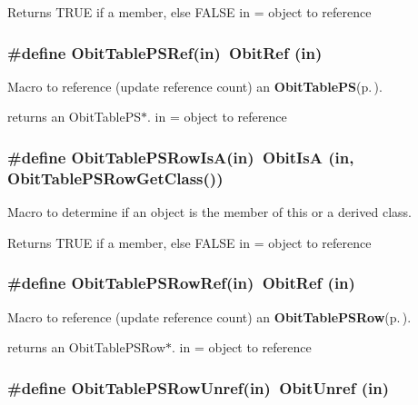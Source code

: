 Returns TRUE if a member, else FALSE in = object to reference 
\subsubsection{\setlength{\rightskip}{0pt plus 5cm}\#define Obit\-Table\-PSRef(in)\ Obit\-Ref (in)}\label{ObitTablePS_8h_a2}


Macro to reference (update reference count) an {\bf Obit\-Table\-PS}{\rm (p.\,\pageref{structObitTablePS})}. 

returns an Obit\-Table\-PS$\ast$. in = object to reference 
\subsubsection{\setlength{\rightskip}{0pt plus 5cm}\#define Obit\-Table\-PSRow\-Is\-A(in)\ Obit\-Is\-A (in, Obit\-Table\-PSRow\-Get\-Class())}\label{ObitTablePS_8h_a6}


Macro to determine if an object is the member of this or a derived class. 

Returns TRUE if a member, else FALSE in = object to reference 
\subsubsection{\setlength{\rightskip}{0pt plus 5cm}\#define Obit\-Table\-PSRow\-Ref(in)\ Obit\-Ref (in)}\label{ObitTablePS_8h_a5}


Macro to reference (update reference count) an {\bf Obit\-Table\-PSRow}{\rm (p.\,\pageref{structObitTablePSRow})}. 

returns an Obit\-Table\-PSRow$\ast$. in = object to reference 
\subsubsection{\setlength{\rightskip}{0pt plus 5cm}\#define Obit\-Table\-PSRow\-Unref(in)\ Obit\-Unref (in)}\label{ObitTablePS_8h_a4}


